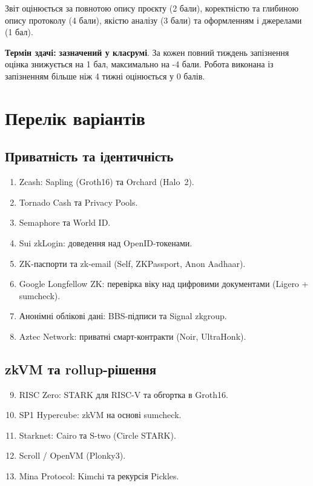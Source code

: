 \documentclass{../../test-template}
\begin{document}
\noindent Звіт оцінюється за повнотою опису проєкту (2 бали), коректністю
та глибиною опису протоколу (4 бали), якістю аналізу (3 бали)
та оформленням і джерелами (1 бал).

\medskip
\noindent \textbf{Термін здачі:} \textbf{зазначений у класрумі}. За кожен повний тиждень
запізнення оцінка знижується на 1 бал, максимально на -4 бали. Робота виконана із запізненням більше ніж 4 тижні оцінюється у 0 балів.

\section*{Перелік варіантів}

\subsection*{Приватність та ідентичність}
\begin{enumerate}
    \item Zcash: Sapling (Groth16) та Orchard (Halo~2).
    \item Tornado Cash та Privacy Pools.
    \item Semaphore та World ID.
    \item Sui zkLogin: доведення над OpenID-токенами.
    \item ZK-паспорти та zk-email (Self, ZKPassport, Anon Aadhaar).
    \item Google Longfellow ZK: перевірка віку над цифровими документами (Ligero + sumcheck).
    \item Анонімні облікові дані: BBS-підписи та Signal zkgroup.
    \item Aztec Network: приватні смарт-контракти (Noir, UltraHonk).
\end{enumerate}

\subsection*{zkVM та rollup-рішення}
\begin{enumerate}
    \setcounter{enumi}{8}
    \item RISC Zero: STARK для RISC-V та обгортка в Groth16.
    \item SP1 Hypercube: zkVM на основі sumcheck.
    \item Starknet: Cairo та S-two (Circle STARK).
    \item Scroll / OpenVM (Plonky3).
    \item Mina Protocol: Kimchi та рекурсія Pickles.
\end{enumerate}
\end{document}
